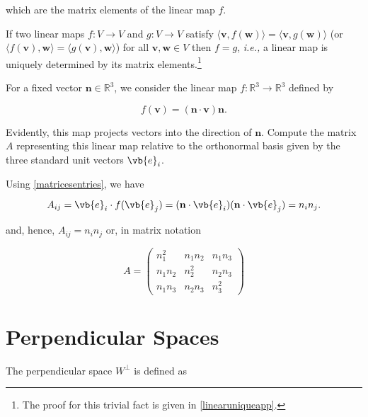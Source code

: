\documentclass[a4paper,12pt]{report}
\begin{document}
which are the matrix elements of the linear map \(f\).

\begin{lemma} \label{linearuniquemap} 
If two linear maps \( f : V \rightarrow V \) and \( g : V \rightarrow V \) satisfy \( \langle \mathbf{v}, f(\mathbf{w}) \rangle = \langle \mathbf{v}, g(\mathbf{w}) \rangle \) (or \( \langle f(\mathbf{v}), \mathbf{w} \rangle = \langle g(\mathbf{v}), \mathbf{w} \rangle \)) for all \( \mathbf{v}, \mathbf{w} \in V \) then \( f = g \), \textit{i.e.,} a linear map is uniquely determined by its matrix elements.\footnote{The proof for this trivial fact is given in \cref{linearuniqueapp}.} 
\end{lemma}

{For a fixed vector \(\mathbf{n} \in \mathbb{R}^3\), we consider the linear map \(f : \mathbb{R}^3 \to \mathbb{R}^3\) defined by

\begin{equation}
f(\mathbf{v}) = (\mathbf{n} \cdot \mathbf{v}) \mathbf{n}.
\end{equation}

Evidently, this map projects vectors into the direction of \(\mathbf{n}\). Compute the matrix \(A\) representing this linear map relative to the orthonormal basis given by the three standard unit vectors \(\vb{e}_i\).
}
{Using \cref{matricesentries}, we have

\begin{equation}
    A_{ij} = \vb{e}_i \cdot f(\vb{e}_j) = (\mathbf{n} \cdot \vb{e}_i)(\mathbf{n} \cdot \vb{e}_j) = n_i n_j.
\end{equation}
    
and, hence, \(A_{ij} = n_i n_j\) or, in matrix notation
    
\begin{equation}
A = \begin{pmatrix}
n_1^2 & n_1 n_2 & n_1 n_3 \\
n_1 n_2 & n_2^2 & n_2 n_3 \\
n_1 n_3 & n_2 n_3 & n_3^2
\end{pmatrix}
\end{equation}} 

\section{Perpendicular Spaces}

The perpendicular space \(W^{\perp } \) is defined as 
\end{document}
